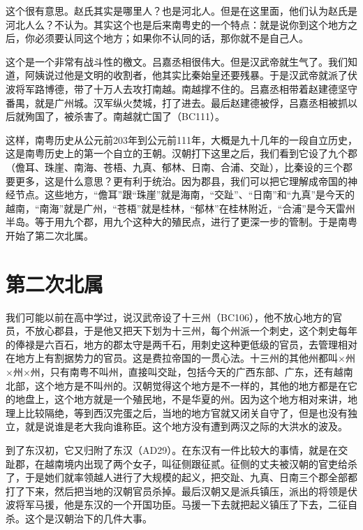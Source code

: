 这个很有意思。赵氏其实是哪里人？也是河北人。但是在这里面，他们认为赵氏是河北人么？不认为。其实这个也是后来南粤史的一个特点：就是说你到这个地方之后，你必须要认同这个地方；如果你不认同的话，那你就不是自己人。

这个是一个非常有战斗性的檄文。吕嘉丞相很伟大。但是汉武帝就生气了。我们知道，阿姨说过他是文明的收割者，他其实比秦始皇还要残暴。于是汉武帝就派了伏波将军路博德，带了十万人去攻打南越。南越撑不住的。吕嘉丞相带着赵建德坚守番禺，就是广州城。汉军纵火焚城，打了进去。最后赵建德被俘，吕嘉丞相被抓以后就殉国了，被杀害了。南越就亡国了（BC111）。

这样，南粤历史从公元前203年到公元前111年，大概是九十几年的一段自立历史，这是南粤历史上的第一个自立的王朝。汉朝打下这里之后，我们看到它设了九个郡（儋耳、珠崖、南海、苍梧、九真、郁林、日南、合浦、交趾），比秦设的三个郡要更多，这是什么意思？更有利于统治。因为郡县，我们可以把它理解成帝国的神经节点。这些地方，“儋耳”跟“珠崖”就是海南，“交趾”、“日南”和“九真”是今天的越南，“南海”就是广州，“苍梧”就是桂林，“郁林”在桂林附近，“合浦”是今天雷州半岛。等于用九个郡，用九个这种大的殖民点，进行了更深一步的管制。于是南粤开始了第二次北属。


\section{第二次北属}

我们可能以前在高中学过，说汉武帝设了十三州（BC106），他不放心地方的官员，不放心郡县，于是他又把天下划为十三州，每个州派一个刺史，这个刺史每年的俸禄是六百石，地方的郡太守是两千石，用刺史这种更低级的官员，去管理相对在地方上有割据势力的官员。这是费拉帝国的一贯心法。十三州的其他州都叫×州×州×州，只有南粤不叫州，直接叫交趾，包括今天的广西东部、广东，还有越南北部，这个地方是不叫州的。汉朝觉得这个地方是不一样的，其他的地方都是在它的地盘上，这个地方就是一个殖民地，不是华夏的州。因为这个地方相对来讲，地理上比较隔绝，等到西汉完蛋之后，当地的地方官就又闭关自守了，但是也没有独立，就是说谁是老大我向谁称臣。这个地方没有遭到两汉之际的大洪水的波及。

到了东汉初，它又归附了东汉（AD29）。在东汉有一件比较大的事情，就是在交趾郡，在越南境内出现了两个女子，叫征侧跟征贰。征侧的丈夫被汉朝的官吏给杀了，于是她们就率领越人进行了大规模的起义，把交趾、九真、日南三个郡全部都打了下来，然后把当地的汉朝官员杀掉。最后汉朝又是派兵镇压，派出的将领是伏波将军马援，他是东汉的一个开国功臣。马援一下去就把起义镇压了下去，二征自杀。这个是汉朝治下的几件大事。



